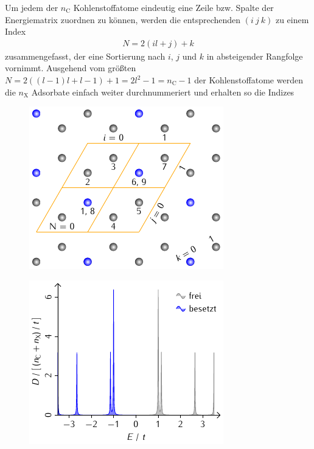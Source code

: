 \documentclass[a4paper, 10pt, twoside, openany]{book} %
\def \nC {n_\mathrm{C}}
\def \nX {n_\mathrm{X}}
\begin{document}
	Um jedem der $\nC$ Kohlenstoffatome eindeutig eine Zeile bzw. Spalte der Energiematrix zuordnen zu können, werden die entsprechenden $(i \ j \ k)$ zu einem Index
	\begin{align*}
		N = 2 (i l + j) + k
	\end{align*}
	zusammengefasst, der eine Sortierung nach $i$, $j$ und $k$ in absteigender Rangfolge vornimmt. Ausgehend vom größten $N = 2 ((l - 1) l + l - 1) + 1 = 2 l^2 - 1 = \nC - 1$ der Kohlenstoffatome werden die $\nX$ Adsorbate einfach weiter durchnummeriert und erhalten so die Indizes
	\begin{figure}
		\begin{minipage}[b]{0.48\textwidth}
			\includegraphics[width=\textwidth]{Abbildungen/Raumstrukturen/Ortsraumbeispiel.pdf}
			\label{Ortsraumbeispiel}
		\end{minipage}
		\hfill
		\begin{minipage}[b]{0.48\textwidth}
			\includegraphics[width=\textwidth]{Abbildungen/Zustandsdichten/Ortsraumbeispiel.pdf}

\end{minipage}
\end{figure}
\end{document}
